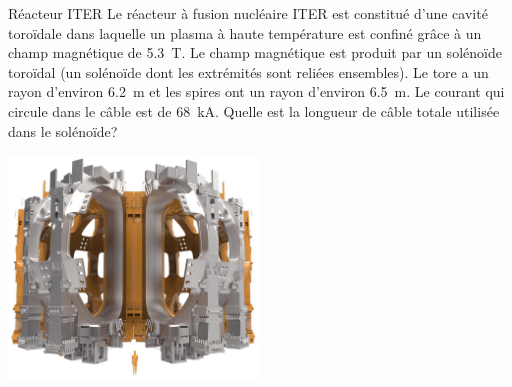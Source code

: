 \documentclass{beamer}
\begin{document}
\begin{frame}{Réacteur ITER}
  Le réacteur à fusion nucléaire ITER est constitué d'une cavité toroïdale dans
  laquelle un plasma à haute température est confiné grâce à un champ
  magnétique de \SI{5.3}{\tesla}. Le champ magnétique est produit par un
  solénoïde toroïdal (un solénoïde dont les extrémités sont reliées ensembles).
  Le tore a un rayon d'environ \SI{6.2}{\meter} et les spires ont un rayon
  d'environ \SI{6.5}{\meter}. Le courant qui circule dans le câble est de
  \SI{68}{\kilo\ampere}. Quelle est la longueur de câble totale utilisée dans
  le solénoïde?

  \begin{center}
    \includegraphics[width=0.5\textwidth]{figures/iter_toroidal_coil.jpg}
  \end{center}
\end{frame}
\end{document}
